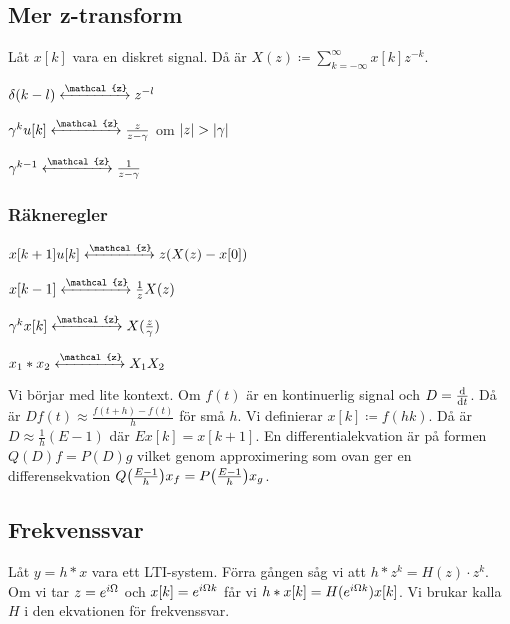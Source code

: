 \documentclass[a4paper]{article}
\begin{document}
\providecommand\fname{}
\renewcommand\fname{19-10-15}

\subsection{Mer z-transform}
Låt \(
    x[k]
\) vara en diskret signal. Då är \(
    X(z) \coloneqq \sum_{k=-\infty}^\infty x[k] z^{-k}
\).

\begin{ex}
    \(
        \delta(k-l) \xleftrightarrow{\mathcal{z}} z^{-l}
    \) 
\end{ex}

\begin{ex}
    \(
        \gamma^k u[k] \xleftrightarrow{\mathcal{z}} \frac{z}{z-\gamma} 
    \) om \(
        \abs{z} > \abs{\gamma}
    \) 
\end{ex}

\begin{ex}
    \(
        \gamma^{k-1} \xleftrightarrow{\mathcal{z}} \frac{1}{z-\gamma} 
    \) 
\end{ex}

\subsubsection{Räkneregler}
\(
    x[k+1]u[k] \xleftrightarrow{\mathcal{z}} z (X(z) - x[0])
\) 

\(
    x[k-1] \xleftrightarrow{\mathcal{z}} \inv{z} X(z)
\) 

\(
    \gamma^k x[k] \xleftrightarrow{\mathcal{z}} X(\frac{z}{\gamma})
\) 

\(
    x_1*x_2 \xleftrightarrow{\mathcal{z}} X_1 X_2
\) 

Vi börjar med lite kontext. Om \(
    f(t)
\) är en kontinuerlig signal och \(
    D = \dv{t}
\). Då är \(
    D f(t) \approx \frac{f(t+h) - f(t)}{h} 
\) för små \(
    h
\). Vi definierar \(
    x[k] \coloneqq f(hk)
\). Då är \(
    D \approx \frac{1}{h} (E-1)
\) där \(
    Ex[k] = x[k+1]
\). En differentialekvation är på formen \(
    Q(D)f = P(D)g
\) vilket genom approximering som ovan ger en differensekvation \(
    Q\qty(\frac{E-1}{h} ) x_f = P\qty(\frac{E-1}{h} ) x_g
\).

\subsection{Frekvenssvar}
Låt \(
    y = h*x
\) vara ett LTI-system. Förra gången såg vi att \(
    h * z^k = H(z) \cdot z^k
\). Om vi tar \(
    z = e^{{i\Omega}}
\) och \(
    x[k] = e^{{i\Omega} k}
\) får vi \(
    h * x[k] = H(e^{{i\Omega} k}) x[k]
\). Vi brukar kalla \(
    H
\) i den ekvationen för frekvenssvar.
\end{document}
